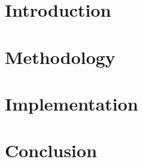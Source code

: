 \documentclass{report}
\begin{document}
\makenewtitlepage

\begin{spacing}{0.5}
    \tableofcontents
\end{spacing}
\newpage

\begin{abstract}
    
\end{abstract}

\section{Introduction}
    


\section{Methodology}
    



\section{Implementation}
    

\section{Conclusion}
    



\end{document}
